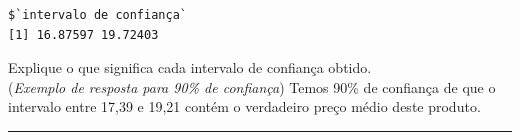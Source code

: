 \documentclass[a4paper,11pt,fleqn]{article}\usepackage[]{graphicx}\usepackage[]{color}
\makeatletter
\newenvironment{kframe}{%
 \def\at@end@of@kframe{}%
 \ifinner\ifhmode%
  \def\at@end@of@kframe{\end{minipage}}%
  \begin{minipage}{\columnwidth}%
 \fi\fi%
 \def\FrameCommand##1{\hskip\@totalleftmargin \hskip-\fboxsep
 \colorbox{shadecolor}{##1}\hskip-\fboxsep
     \hskip-\linewidth \hskip-\@totalleftmargin \hskip\columnwidth}%
 \MakeFramed {\advance\hsize-\width
   \@totalleftmargin\z@ \linewidth\hsize
   \@setminipage}}%
 {\par\unskip\endMakeFramed%
 \at@end@of@kframe}
\newenvironment{knitrout}{}{} %
\theoremstyle{definition}
\makeatother
\begin{document}
\begin{compactenum}[4.]
\begin{compactenum}
\begin{knitrout}
\begin{kframe}
\begin{alltt}
\end{alltt}
\begin{verbatim}
$`intervalo de confiança`
[1] 16.87597 19.72403
\end{verbatim}
\end{kframe}
\end{knitrout}
  \item Explique o que significa cada intervalo de confiança obtido.\\
(\textit{Exemplo de resposta para 90\% de confiança}) Temos 90\% de
confiança de que o intervalo entre 17,39 e 19,21 contém o verdadeiro
preço médio deste produto.
  \end{compactenum}
\end{compactenum}

\vspace{0.3cm}
\hrule
\vspace{0.3cm}
\end{document}
